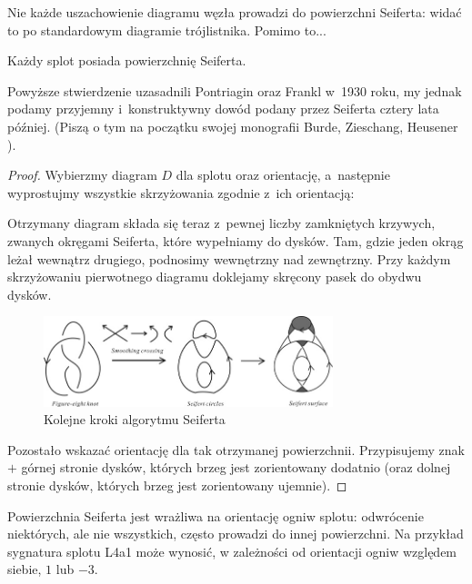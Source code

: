 Nie każde uszachowienie diagramu węzła prowadzi do powierzchni Seiferta: widać to po standardowym diagramie trójlistnika.
Pomimo to...

\begin{proposition}
\label{prp:seifert_exists}%
    Każdy splot posiada powierzchnię Seiferta.
\end{proposition}

Powyższe stwierdzenie uzasadnili Pontriagin oraz Frankl w~1930 roku, my jednak podamy przyjemny i~konstruktywny dowód podany przez Seiferta \cite{seifert1935} cztery lata później.
%
(Piszą o tym na początku swojej monografii Burde, Zieschang, Heusener \cite[s. 19]{burde2014}).

\begin{proof}
%
    Wybierzmy diagram $D$ dla splotu oraz orientację,
    a~następnie wyprostujmy wszystkie skrzyżowania zgodnie z~ich orientacją:

    Otrzymany diagram składa się teraz z~pewnej liczby zamkniętych krzywych,
    zwanych okręgami Seiferta, które wypełniamy do dysków.
    Tam, gdzie jeden okrąg leżał wewnątrz drugiego, podnosimy wewnętrzny nad zewnętrzny.
    Przy każdym skrzyżowaniu pierwotnego diagramu doklejamy skręcony pasek do obydwu dysków.

    \begin{figure}[H]
        \centering
        \includegraphics[width=0.75\textwidth]{../data/seifert-algorithm.jpg}
        \caption[Smthing]{Kolejne kroki algorytmu Seiferta}
    \end{figure}

    Pozostało wskazać orientację dla tak otrzymanej powierzchnii.
    Przypisujemy znak $+$ górnej stronie dysków, których brzeg jest zorientowany dodatnio (oraz dolnej stronie dysków, których brzeg jest zorientowany ujemnie).
%
\end{proof}

Powierzchnia Seiferta jest wrażliwa na orientację ogniw splotu: odwrócenie niektórych, ale nie wszystkich, często prowadzi do innej powierzchni.
Na przykład sygnatura splotu L4a1 może wynosić, w zależności od orientacji ogniw względem siebie, $1$ lub $-3$.

%


